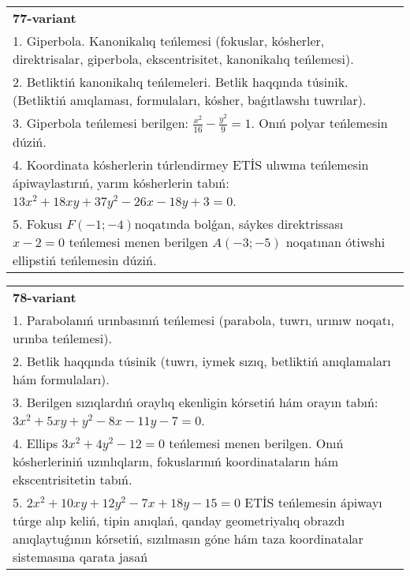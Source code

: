 \documentclass{article}
\begin{document}
\begin{tabular}{m{17cm}}
\textbf{77-variant}\\
1. Giperbola. Kanonikalıq teńlemesi (fokuslar, kósherler, direktrisalar, giperbola, ekscentrisitet, kanonikalıq teńlemesi).\\

2. Betliktiń kanonikalıq teńlemeleri. Betlik haqqında túsinik. (Betliktiń anıqlaması, formulaları, kósher, baǵıtlawshı tuwrılar).\\

3. Giperbola teńlemesi berilgen: $\frac{x^{2}}{16}-\frac{y^{2}}{9}=1$. Onıń polyar teńlemesin dúziń.\\

4. Koordinata kósherlerin túrlendirmey ETİS ulıwma teńlemesin ápiwaylastırıń, yarım kósherlerin tabıń: $13x^{2} + 18xy + 37y^{2} - 26x - 18y + 3 = 0$.  \\

5. Fokusı $F( - 1; - 4)$noqatında bolǵan, sáykes direktrissası $x - 2 = 0$ teńlemesi menen berilgen $A( - 3; - 5)$ noqatınan ótiwshi ellipstiń teńlemesin dúziń.  
\end{tabular}
\vspace{1cm}


\begin{tabular}{m{17cm}}
\textbf{78-variant}\\
1. Parabolanıń urınbasınıń teńlemesi (parabola, tuwrı, urınıw noqatı, urınba teńlemesi).\\

2. Betlik haqqında túsinik (tuwrı, iymek sızıq, betliktiń anıqlamaları hám formulaları).\\

3. Berilgen sızıqlardıń oraylıq ekenligin kórsetiń hám orayın tabıń: $3 x^{2}+5 xy+y^{2}-8 x-11 y-7=0$.\\

4. Ellips $3x^{2} + 4y^{2} - 12 = 0$ teńlemesi menen berilgen. Onıń kósherleriniń uzınlıqların, fokuslarınıń koordinataların hám ekscentrisitetin tabıń.  \\

5. $2x^{2} + 10xy + 12y^{2} - 7x + 18y - 15 = 0$ ETİS teńlemesin ápiwayı túrge alıp keliń, tipin anıqlań, qanday geometriyalıq obrazdı anıqlaytuǵının kórsetiń, sızılmasın góne hám taza koordinatalar sistemasına qarata jasań  
\end{tabular}
\vspace{1cm}
\end{document}
